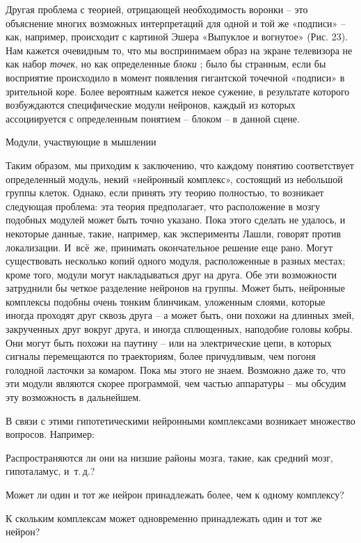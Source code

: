 \documentclass[../main.tex]{subfiles}
\begin{document}
Другая проблема с теорией, отрицающей необходимость воронки \--- это объяснение многих возможных интерпретаций для одной и той же «подписи» \--- как, например, происходит с картиной Эшера «Выпуклое и вогнутое» (Рис. 23). Нам кажется очевидным то, что мы воспринимаем образ на экране телевизора не как набор \emph{точек}, но как определенные \emph{блоки} ; было бы странным, если бы восприятие происходило в момент появления гигантской точечной «подписи» в зрительной коре. Более вероятным кажется некое сужение, в результате которого возбуждаются специфические модули нейронов, каждый из которых ассоциируется с определенным понятием \--- блоком \--- в данной сцене.~~

Модули, участвующие в мышлении

Таким образом, мы приходим к заключению, что каждому понятию соответствует определенный модуль, некий «нейронный комплекс», состоящий из небольшой группы клеток. Однако, если принять эту теорию полностью, то возникает следующая проблема: эта теория предполагает, что расположение в мозгу подобных модулей может быть точно указано. Пока этого сделать не удалось, и некоторые данные, такие, например, как эксперименты Лашли, говорят против локализации. И~всё~же, принимать окончательное решение еще рано. Могут существовать несколько копий одного модуля, расположенные в разных местах; кроме того, модули могут накладываться друг на друга. Обе эти возможности затруднили бы четкое разделение нейронов на группы. Может быть, нейронные комплексы подобны очень тонким блинчикам, уложенным слоями, которые иногда проходят друг сквозь друга \--- а может быть, они похожи на длинных змей, закрученных друг вокруг друга, и иногда сплющенных, наподобие головы кобры. Они могут быть похожи на паутину \--- или на электрические цепи, в которых сигналы перемещаются по траекториям, более причудливым, чем погоня голодной ласточки за комаром. Пока мы этого не знаем. Возможно даже то, что эти модули являются скорее программой, чем частью аппаратуры \--- мы обсудим эту возможность в дальнейшем.

В связи с этими гипотетическими нейронными комплексами возникает множество вопросов. Например:

Распространяются ли они на низшие районы мозга, такие, как средний мозг, гипоталамус, и~т.\,д.?

Может ли один и тот же нейрон принадлежать более, чем к одному комплексу?

К скольким комплексам может одновременно принадлежать один и тот же нейрон?
\end{document}
